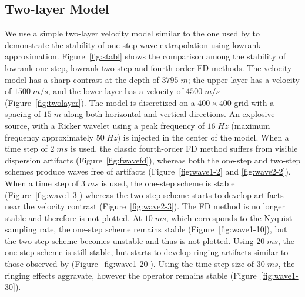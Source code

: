 \subsection{Two-layer Model}

We use a simple two-layer velocity model similar to the one used by \cite{rite} to demonstrate the stability of one-step wave extrapolation using lowrank approximation. Figure~\ref{fig:stabl} shows the comparison among the stability of lowrank one-step, lowrank two-step and fourth-order FD methods. The velocity model has a sharp contrast at the depth of $3795\;m$; the upper layer has a velocity of $1500\;m/s$, and the lower layer has a velocity of $4500\;m/s$ (Figure~\ref{fig:twolayer}). The model is discretized on a $400 \times 400$ grid with a spacing of $15\;m$ along both horizontal and vertical directions. An explosive source, with a Ricker wavelet using a peak frequency of $16\;Hz$ (maximum frequency approximately $50\;Hz$) is injected in the center of the model. When a time step of $2\;ms$ is used, the classic fourth-order FD method suffers from visible dispersion artifacts (Figure~\ref{fig:fwavefd}), whereas both the one-step and two-step schemes produce waves free of artifacts (Figure~\ref{fig:wave1-2} and \ref{fig:wave2-2}).  When a time step of $3\;ms$ is used, the one-step scheme is stable (Figure~\ref{fig:wave1-3}) whereas the two-step scheme starts to develop artifacts near the velocity contrast (Figure~\ref{fig:wave2-3}). The FD method is no longer stable and therefore is not plotted. At $10\;ms$, which corresponds to the Nyquist sampling rate, the one-step scheme remains stable (Figure~\ref{fig:wave1-10}), but the two-step scheme becomes unstable and thus is not plotted. Using $20\;ms$, the one-step scheme is still stable, but starts to develop ringing artifacts similar to those observed by \cite{rite} (Figure~\ref{fig:wave1-20}). Using the time step size of $30\;ms$, the ringing effects aggravate, however the operator remains stable (Figure~\ref{fig:wave1-30}).

